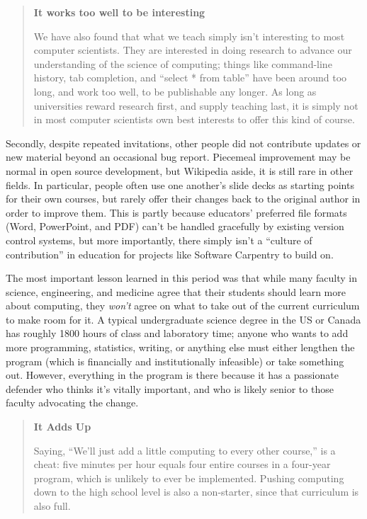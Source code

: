 \documentclass[10pt,a4paper,twocolumn]{article}
\begin{document}
\begin{quote}
\textbf{It works too well to be interesting}

We have also found that what we teach simply isn't interesting to most
computer scientists. They are interested in doing research to advance
our understanding of the science of computing; things like command-line
history, tab completion, and ``select * from table'' have been around
too long, and work too well, to be publishable any longer. As long as
universities reward research first, and supply teaching last, it is
simply not in most computer scientists own best interests to offer this
kind of course.
\end{quote}

Secondly, despite repeated invitations, other people did not
contribute updates or new material beyond an occasional bug report.
Piecemeal improvement may be normal in open source development, but
Wikipedia aside, it is still rare in other fields. In particular,
people often use one another's slide decks as starting points for
their own courses, but rarely offer their changes back to the original
author in order to improve them. This is partly because educators'
preferred file formats (Word, PowerPoint, and PDF) can't be handled
gracefully by existing version control systems, but more importantly,
there simply isn't a ``culture of contribution'' in education for
projects like Software Carpentry to build on.

The most important lesson learned in this period was that while many
faculty in science, engineering, and medicine agree that their
students should learn more about computing, they \emph{won't} agree on
what to take out of the current curriculum to make room for it. A
typical undergraduate science degree in the US or Canada has roughly
1800 hours of class and laboratory time; anyone who wants to add more
programming, statistics, writing, or anything else must either
lengthen the program (which is financially and institutionally
infeasible) or take something out. However, everything in the program
is there because it has a passionate defender who thinks it's vitally
important, and who is likely senior to those faculty advocating the
change.

\begin{quote}
\textbf{It Adds Up}

Saying, ``We'll just add a little computing to every other course,'' is
a cheat: five minutes per hour equals four entire courses in a four-year
program, which is unlikely to ever be implemented. Pushing computing
down to the high school level is also a non-starter, since that
curriculum is also full.
\end{quote}
\end{document}
